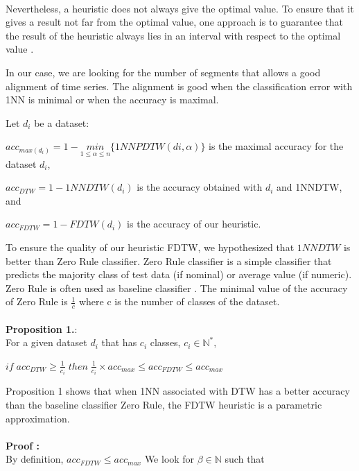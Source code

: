 \paragraph{}Nevertheless, a heuristic does not always give the optimal value. To ensure that
it gives a result not far from the optimal value, one approach is to
 guarantee that the result of the heuristic always lies in an interval with respect to the optimal
value \cite{ibarra1975fast}.

In our case, we are looking for the number of segments that allows a good
alignment of time series. The alignment is good when the classification error
with 1NN is minimal or when the accuracy is maximal.

Let $d_i$ be a dataset: 

$acc_{max(d_i)} = 1-\underset{1\leq\alpha\leq
n}{min}\{1NNPDTW(di,\alpha)\}$ is the maximal accuracy for the dataset $d_i$,

$acc_{DTW} = 1 - 1NNDTW(d_i)$ is the accuracy obtained with $d_i$ and 1NNDTW, and


$acc_{FDTW}=1 - FDTW(d_i)$ is the accuracy of our heuristic.

To ensure the quality of our heuristic FDTW, we hypothesized that $1NNDTW$ is better than
Zero Rule classifier. Zero Rule classifier is a simple classifier that predicts the majority class of test data (if nominal) or average value (if numeric). Zero Rule is often
used as baseline classifier \cite{cuvrin2007meeting}. The minimal value of the
accuracy of Zero Rule is $\frac{1}{c}$ where c is the number of classes of the
dataset.

\paragraph{}\textbf{Proposition 1.}:\\
For a given dataset $d_i$ that has $c_i$ classes, $c_i\in \mathbb{N}^*,$

$
if \; acc_{DTW} \geq \frac{1}{c_i} \; then \;  \frac{1}{c_i} \times acc_{max}
\leq acc_{FDTW} \leq acc_{max}
$

Proposition 1 shows that when 1NN associated with DTW has a better accuracy than the baseline
classifier Zero Rule, the FDTW heuristic is a parametric approximation.

\paragraph{}\textbf{Proof : }\\
By definition, $ acc_{FDTW} \leq acc_{max}$ 
We look for $\beta \in \mathbb{N}$ such that 


